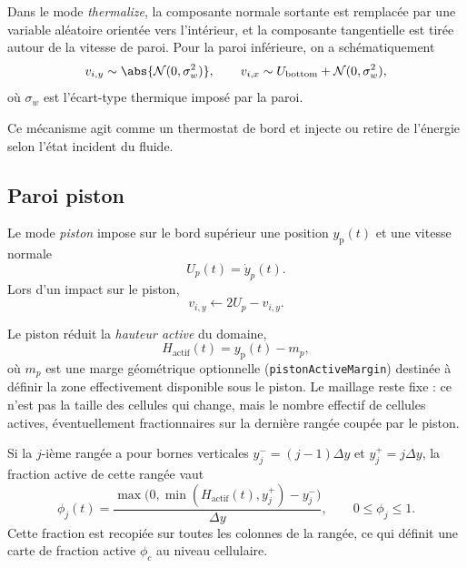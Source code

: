 \documentclass[11pt,a4paper]{article}
\begin{document}
Dans le mode \emph{thermalize}, la composante normale sortante est remplacée par une variable aléatoire orientée vers l'intérieur, et la composante tangentielle est tirée autour de la vitesse de paroi. Pour la paroi inférieure, on a schématiquement
\begin{equation}
 v_{i,y} \sim \abs{\mathcal{N}(0,\sigma_w^2)},
\qquad
 v_{i,x} \sim U_{\mathrm{bottom}} + \mathcal{N}(0,\sigma_w^2),
\end{equation}
où $\sigma_w$ est l'écart-type thermique imposé par la paroi.

Ce mécanisme agit comme un thermostat de bord et injecte ou retire de l'énergie selon l'état incident du fluide.

\subsection{Paroi piston}

Le mode \emph{piston} impose sur le bord supérieur une position $y_{\mathrm{p}}(t)$ et une vitesse normale
\begin{equation}
 U_p(t) = \dot y_p(t).
\end{equation}
Lors d'un impact sur le piston,
\begin{equation}
 v_{i,y} \leftarrow 2U_p - v_{i,y}.
\end{equation}

Le piston réduit la \emph{hauteur active} du domaine,
\begin{equation}
 H_{\mathrm{actif}}(t)=y_{\mathrm{p}}(t)-m_p,
\end{equation}
où $m_p$ est une marge géométrique optionnelle (\verb|pistonActiveMargin|) destinée à définir la zone effectivement disponible sous le piston. Le maillage reste fixe : ce n'est pas la taille des cellules qui change, mais le nombre effectif de cellules actives, éventuellement fractionnaires sur la dernière rangée coupée par le piston.

Si la $j$-ième rangée a pour bornes verticales $y_j^-=(j-1)\Delta y$ et $y_j^+=j\Delta y$, la fraction active de cette rangée vaut
\begin{equation}
 \phi_j(t)=\frac{\max\!\bigl(0,\min(H_{\mathrm{actif}}(t),y_j^+)-y_j^-\bigr)}{\Delta y},
 \qquad 0\le \phi_j\le 1.
\end{equation}
Cette fraction est recopiée sur toutes les colonnes de la rangée, ce qui définit une carte de fraction active \(\phi_c\) au niveau cellulaire.
\end{document}
